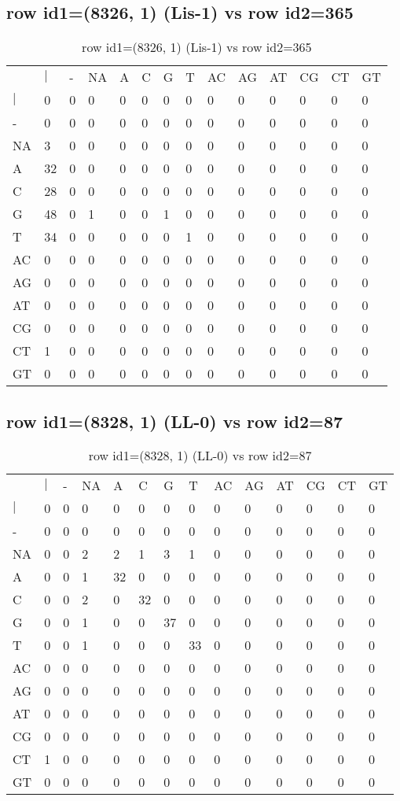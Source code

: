 \subsection{row id1=(8326, 1) (Lis-1) vs row id2=365}
\begin{center}
\begin{longtable}{|l|l|l|l|l|l|l|l|l|l|l|l|l|l|}
\caption{row id1=(8326, 1) (Lis-1) vs row id2=365} \label{table_dm324}\\
\hline
\\
\hline
&$|$&-&NA&A&C&G&T&AC&AG&AT&CG&CT&GT\\
$|$&0&0&0&0&0&0&0&0&0&0&0&0&0\\
-&0&0&0&0&0&0&0&0&0&0&0&0&0\\
NA&3&0&0&0&0&0&0&0&0&0&0&0&0\\
A&32&0&0&0&0&0&0&0&0&0&0&0&0\\
C&28&0&0&0&0&0&0&0&0&0&0&0&0\\
G&48&0&1&0&0&1&0&0&0&0&0&0&0\\
T&34&0&0&0&0&0&1&0&0&0&0&0&0\\
AC&0&0&0&0&0&0&0&0&0&0&0&0&0\\
AG&0&0&0&0&0&0&0&0&0&0&0&0&0\\
AT&0&0&0&0&0&0&0&0&0&0&0&0&0\\
CG&0&0&0&0&0&0&0&0&0&0&0&0&0\\
CT&1&0&0&0&0&0&0&0&0&0&0&0&0\\
GT&0&0&0&0&0&0&0&0&0&0&0&0&0\\
\hline
\end{longtable}
\end{center}

\subsection{row id1=(8328, 1) (LL-0) vs row id2=87}
\begin{center}
\begin{longtable}{|l|l|l|l|l|l|l|l|l|l|l|l|l|l|}
\caption{row id1=(8328, 1) (LL-0) vs row id2=87} \label{table_dm326}\\
\hline
\\
\hline
&$|$&-&NA&A&C&G&T&AC&AG&AT&CG&CT&GT\\
$|$&0&0&0&0&0&0&0&0&0&0&0&0&0\\
-&0&0&0&0&0&0&0&0&0&0&0&0&0\\
NA&0&0&2&2&1&3&1&0&0&0&0&0&0\\
A&0&0&1&32&0&0&0&0&0&0&0&0&0\\
C&0&0&2&0&32&0&0&0&0&0&0&0&0\\
G&0&0&1&0&0&37&0&0&0&0&0&0&0\\
T&0&0&1&0&0&0&33&0&0&0&0&0&0\\
AC&0&0&0&0&0&0&0&0&0&0&0&0&0\\
AG&0&0&0&0&0&0&0&0&0&0&0&0&0\\
AT&0&0&0&0&0&0&0&0&0&0&0&0&0\\
CG&0&0&0&0&0&0&0&0&0&0&0&0&0\\
CT&1&0&0&0&0&0&0&0&0&0&0&0&0\\
GT&0&0&0&0&0&0&0&0&0&0&0&0&0\\
\hline
\end{longtable}
\end{center}

